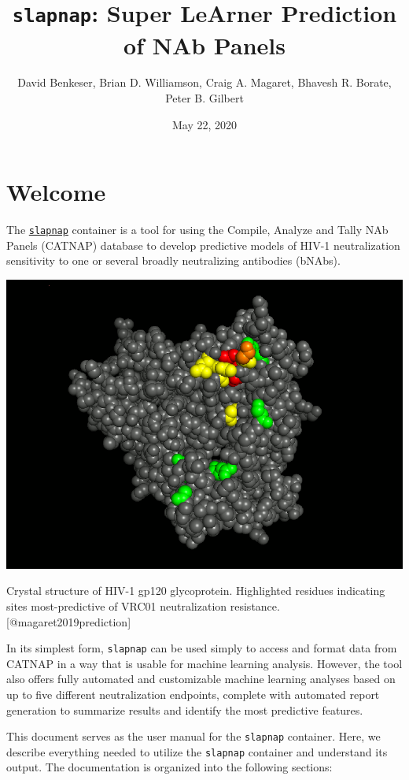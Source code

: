 \documentclass[]{article}
\title{\texttt{slapnap}: Super LeArner Prediction of NAb Panels}
\author{David Benkeser, Brian D. Williamson, Craig A. Magaret, Bhavesh R.
Borate, Peter B. Gilbert}
\date{May 22, 2020}
\begin{document}
\maketitle

{
\setcounter{tocdepth}{2}
\tableofcontents
}
\section*{Welcome}\label{welcome}

The \href{https://hub.docker.com/r/slapnap/slapnap}{\texttt{slapnap}}
container is a tool for using the Compile, Analyze and Tally NAb Panels
(CATNAP) database to develop predictive models of HIV-1 neutralization
sensitivity to one or several broadly neutralizing antibodies (bNAbs).

\begin{center}\includegraphics[width=0.7\linewidth]{gp120} \end{center}\begin{center}
Crystal structure of HIV-1 gp120 glycoprotein. Highlighted residues
indicating sites most-predictive of VRC01 neutralization resistance.
{[}@magaret2019prediction{]}
\end{center}

In its simplest form, \texttt{slapnap} can be used simply to access and
format data from CATNAP in a way that is usable for machine learning
analysis. However, the tool also offers fully automated and customizable
machine learning analyses based on up to five different neutralization
endpoints, complete with automated report generation to summarize
results and identify the most predictive features.

This document serves as the user manual for the \texttt{slapnap}
container. Here, we describe everything needed to utilize the
\texttt{slapnap} container and understand its output. The documentation
is organized into the following sections:
\end{document}
